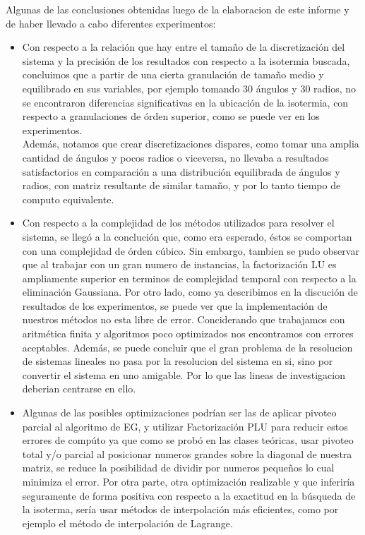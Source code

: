 \documentclass[12pt,a4paper]{article}
\begin{document}
Algunas de las conclusiones obtenidas luego de la elaboracion de este informe y de haber llevado a cabo diferentes experimentos:
\begin{itemize}
\item Con respecto a la relación que hay entre el tamaño de la discretización del sistema y la precisión de los resultados con respecto a la isotermia buscada, concluimos que a partir de una cierta granulación de tamaño medio y equilibrado en sus variables, por ejemplo tomando 30 ángulos y 30 radios, no se encontraron diferencias significativas en la ubicación de la isotermia, con respecto a granulaciones de órden superior, como se puede ver en los experimentos. \\

Además, notamos que crear discretizaciones dispares, como tomar una amplia cantidad de ángulos y pocos radios o viceversa, no llevaba a resultados satisfactorios en comparación a una distribución equilibrada de ángulos y radios, con matriz resultante de similar tamaño, y por lo tanto tiempo de computo equivalente.

\item Con respecto a la complejidad de los métodos utilizados para resolver el sistema, se llegó a la conclución que, como era esperado, éstos se comportan con una complejidad de órden cúbico. Sin embargo, tambien se pudo observar que al trabajar con un gran numero de instancias, la factorización LU es ampliamente superior en terminos de complejidad temporal con respecto a la eliminación Gaussiana. 
Por otro lado, como ya describimos en la discución de resultados de los experimentos, se puede ver que la implementación de nuestros métodos no esta libre de error. Conciderando que trabajamos con aritmética finita y algoritmos poco optimizados nos encontramos con errores aceptables.
Además, se puede concluir que el gran problema de la resolucion de sistemas lineales no pasa por la resolucion del sistema en si, sino por convertir el sistema en uno amigable. Por lo que las lineas de investigacion deberian centrarse en ello.

\item Algunas de las posibles optimizaciones podrían ser las de aplicar pivoteo parcial al algoritmo de EG, y utilizar Factorización PLU para reducir estos errores de compúto ya que como se probó en las clases teóricas, usar pivoteo total y/o parcial al posicionar numeros grandes sobre la diagonal de nuestra matriz, se reduce la posibilidad de dividir por numeros pequeños lo cual minimiza el error.
Por otra parte, otra optimización realizable y que inferiría seguramente de forma positiva con respecto a la exactitud en la búsqueda de la isoterma, sería usar métodos de interpolación más eficientes, como por ejemplo el método de interpolación de Lagrange.

\end{itemize}
\end{document}
